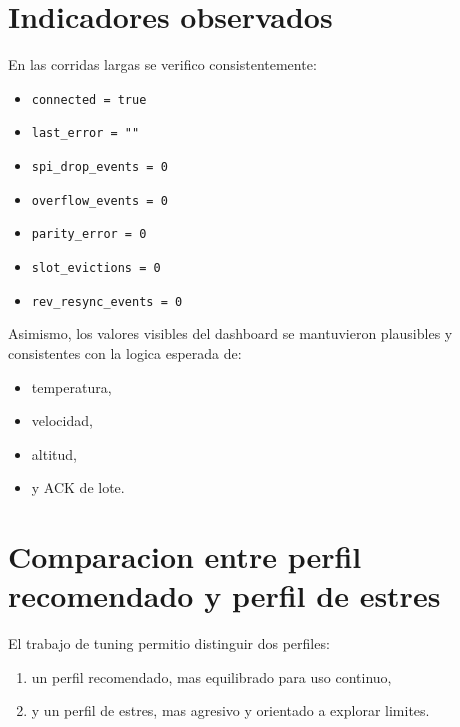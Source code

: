 \documentclass[12pt,a4paper,oneside]{report}
\begin{document}
\section{Indicadores observados}

En las corridas largas se verifico consistentemente:

\begin{itemize}[leftmargin=1.2cm]
    \item \texttt{connected = true}
    \item \texttt{last\_error = ""}
    \item \texttt{spi\_drop\_events = 0}
    \item \texttt{overflow\_events = 0}
    \item \texttt{parity\_error = 0}
    \item \texttt{slot\_evictions = 0}
    \item \texttt{rev\_resync\_events = 0}
\end{itemize}

Asimismo, los valores visibles del dashboard se mantuvieron plausibles y consistentes con la logica esperada de:

\begin{itemize}[leftmargin=1.2cm]
    \item temperatura,
    \item velocidad,
    \item altitud,
    \item y ACK de lote.
\end{itemize}

\section{Comparacion entre perfil recomendado y perfil de estres}

El trabajo de tuning permitio distinguir dos perfiles:

\begin{enumerate}[leftmargin=1.2cm]
    \item un perfil recomendado, mas equilibrado para uso continuo,
    \item y un perfil de estres, mas agresivo y orientado a explorar limites.
\end{enumerate}
\end{document}
